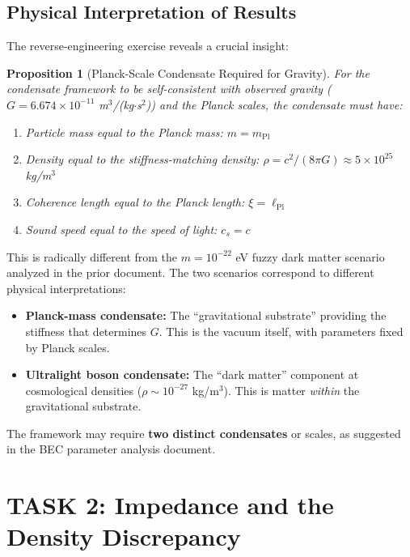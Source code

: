 \documentclass[11pt,a4paper]{article}
\newcommand{\ee}[1]{\times 10^{#1}}
\newcommand{\lPl}{\ensuremath{\ell_{\mathrm{Pl}}}}
\newcommand{\mPl}{\ensuremath{m_{\mathrm{Pl}}}}
\newtheorem{proposition}{Proposition}
\theoremstyle{definition}
\begin{document}
\subsection{Physical Interpretation of Results}
\label{sec:physical_interpretation}

The reverse-engineering exercise reveals a crucial insight:

\begin{proposition}[Planck-Scale Condensate Required for Gravity]
\label{prop:planck_condensate}
For the condensate framework to be self-consistent with observed gravity ($G = 6.674 \ee{-11}$ m$^3$/(kg$\cdot$s$^2$)) and the Planck scales, the condensate must have:
\begin{enumerate}
    \item Particle mass equal to the Planck mass: $m = \mPl$
    \item Density equal to the stiffness-matching density: $\rho = c^2/(8\pi G) \approx 5 \ee{25}$ kg/m$^3$
    \item Coherence length equal to the Planck length: $\xi = \lPl$
    \item Sound speed equal to the speed of light: $c_s = c$
\end{enumerate}
\end{proposition}

This is radically different from the $m = 10^{-22}$ eV fuzzy dark matter scenario analyzed in the prior document. The two scenarios correspond to different physical interpretations:

\begin{itemize}
    \item \textbf{Planck-mass condensate:} The ``gravitational substrate'' providing the stiffness that determines $G$. This is the vacuum itself, with parameters fixed by Planck scales.

    \item \textbf{Ultralight boson condensate:} The ``dark matter'' component at cosmological densities ($\rho \sim 10^{-27}$ kg/m$^3$). This is matter \emph{within} the gravitational substrate.
\end{itemize}

The framework may require \textbf{two distinct condensates} or scales, as suggested in the BEC parameter analysis document.

\section{TASK 2: Impedance and the Density Discrepancy}
\label{sec:task2}
\end{document}
